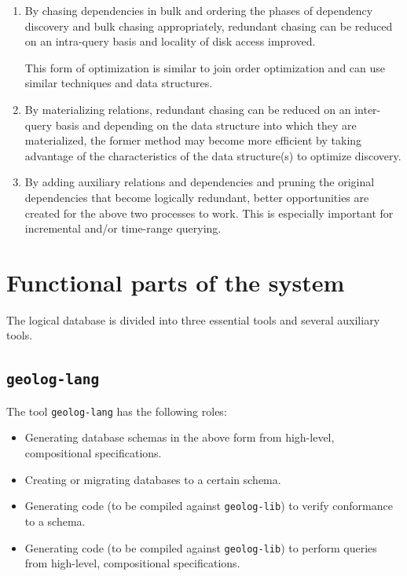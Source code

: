 \documentclass{article}
\begin{document}
\begin{enumerate}
	\item	By chasing dependencies in bulk and ordering the phases of dependency discovery and bulk chasing appropriately, redundant chasing can be reduced on an intra-query basis and locality of disk access improved.

		This form of optimization is similar to join order optimization and can use similar techniques and data structures.

	\item	By materializing relations, redundant chasing can be reduced on an inter-query basis and depending on the data structure into which they are materialized, the former method may become more efficient by taking advantage of the characteristics of the data structure(s) to optimize discovery.

	\item	By adding auxiliary relations and dependencies and pruning the original dependencies that become logically redundant, better opportunities are created for the above two processes to work.  This is especially important for incremental and/or time-range querying.
\end{enumerate}

\section{Functional parts of the system}

The logical database is divided into three essential tools and several auxiliary tools.

\subsection{\tt geolog-lang}

The tool {\tt geolog-lang} has the following roles:

\begin{itemize}
	\item	Generating database schemas in the above form from high-level, compositional specifications.
	\item	Creating or migrating databases to a certain schema.
	\item	Generating code (to be compiled against {\tt geolog-lib}) to verify conformance to a schema.
	\item   Generating code (to be compiled against {\tt geolog-lib}) to perform queries from high-level, compositional specifications.
\end{itemize}
\end{document}
